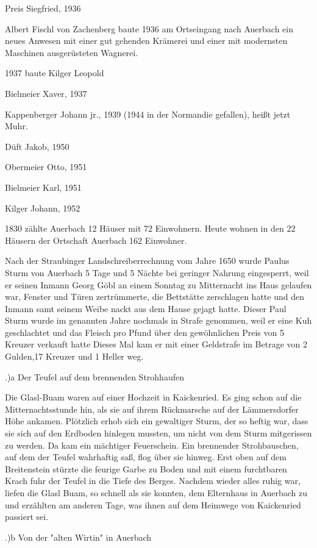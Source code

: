Preis Siegfried, 1936

Albert Fischl von Zachenberg baute 1936 am Ortseingang nach Auerbach ein neues
Anwesen mit einer gut gehenden Krämerei und einer mit modernsten Maschinen
ausgerüsteten Wagnerei.

1937 baute Kilger Leopold

Bielmeier Xaver, 1937

Kappenberger Johann jr., 1939 (1944 in der Normandie gefallen), heißt jetzt
Muhr.

Düft Jakob, 1950

Obermeier Otto, 1951

Bielmeier Karl, 1951

Kilger Johann, 1952



1830 zählte Auerbach 12 Häuser mit 72 Einwohnern. Heute wohnen in den 22 Häusern
der Ortschaft Auerbach 162 Einwohner.

Nach der Straubinger Landschreiberrechnung vom Jahre 1650 wurde Paulus Sturm von
Auerbach 5 Tage und 5 Nächte bei geringer Nahrung eingesperrt, weil er seinen
Inmann Georg Göbl an einem Sonntag zu Mitternacht ins Haus gelaufen war, Fenster
und Türen zertrümmerte, die Bettstätte zerschlagen hatte und den Inmann samt
seinem Weibe nackt aus dem Hause gejagt hatte. Dieser Paul Sturm wurde im
genannten Jahre nochmals in Strafe genommen, weil er eine Kuh geschlachtet und
das Fleisch pro Pfund über den gewöhnlichen Preis von 5 Kreuzer verkauft hatte
Dieses Mal kam er mit einer Geldstrafe im Betrage von 2 Gulden,17 Kreuzer und 1
Heller weg.

.)a Der Teufel auf dem brennenden Strohhaufen

Die Glasl-Buam waren auf einer Hochzeit in Kaickenried. Es ging schon auf die
Mitternachtsstunde hin, als sie auf ihrem Rückmarsche auf der Lämmersdorfer Höhe
ankamen. Plötzlich erhob sich ein gewaltiger Sturm, der so heftig war, dass sie
sich auf den Erdboden hinlegen mussten, um nicht von dem Sturm mitgerissen zu
werden. Da kam ein mächtiger Feuerschein. Ein brennender Strohbauschen, auf dem
der Teufel wahrhaftig saß, flog über sie hinweg. Erst oben auf dem Breitenstein
stürzte die feurige Garbe zu Boden und mit einem furchtbaren Krach fuhr der
Teufel in die Tiefe des Berges. Nachdem wieder alles ruhig war, liefen die Glasl
Buam, so schnell als sie konnten, dem Elternhaus in Auerbach zu und erzählten am
anderen Tage, was ihnen auf dem Heimwege von Kaickenried passiert sei.

.)b Von der "alten Wirtin" in Auerbach

